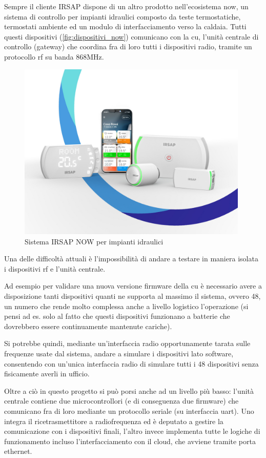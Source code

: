 \documentclass[12pt,a4paper,twoside,titlepage]{book}
\begin{document}
Sempre il cliente IRSAP dispone di un altro prodotto nell'ecosistema \Gls{now},
un sistema di controllo per impianti idraulici composto da teste termostatiche,
termostati ambiente ed un modulo di interfacciamento verso la caldaia. Tutti questi
dispositivi (\autoref{fig:dispositivi_now}) comunicano con la \acrfull{cu}, l'unità 
centrale di controllo (\gls{gateway}) che coordina fra di loro tutti i dispositivi radio, 
tramite un protocollo \acrshort{rf} su banda 868MHz.

\begin{figure}[h]
    \centering
    \includegraphics[width=11cm]{img/now.jpeg}
    \caption{Sistema IRSAP NOW per impianti idraulici}
    \label{fig:dispositivi_now}
\end{figure}

Una delle difficoltà attuali è l'impossibilità di andare a testare in maniera isolata i
dispositivi \Gls{rf} e l'unità centrale.

Ad esempio per validare una nuova versione \gls{firmware} della \acrshort{cu} è necessario
avere a disposizione tanti dispositivi quanti ne supporta al massimo il sistema, ovvero 48, 
un numero che rende molto complessa anche a livello logistico l'operazione (si pensi ad es.
solo al fatto che questi dispositivi funzionano a batterie che dovrebbero essere continuamente
mantenute cariche).

Si potrebbe quindi, mediante un'interfaccia radio opportunamente tarata sulle frequenze usate
dal sistema, andare a simulare i dispositivi lato software, consentendo con un'unica interfaccia
radio di simulare tutti i 48 dispositivi senza fisicamente averli in ufficio.

Oltre a ciò in questo progetto si può porsi anche ad un livello più basso: l'unità
centrale contiene due microcontrollori (e di conseguenza due \gls{firmware}) che comunicano fra di
loro mediante un protocollo seriale (su interfaccia \acrshort{uart}). Uno integra il ricetrasmettitore
a radiofrequenza ed è deputato a gestire la comunicazione con i dispositivi
finali, l'altro invece implementa tutte le logiche di funzionamento incluso l'interfacciamento
con il cloud, che avviene tramite porta ethernet.
\end{document}
